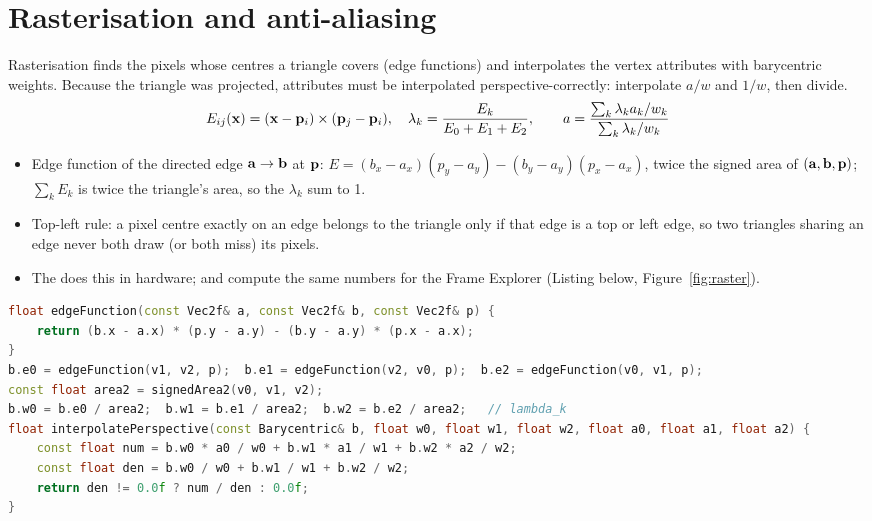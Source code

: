 \section{Rasterisation and anti-aliasing}
\label{sec:raster}
Rasterisation finds the pixels whose centres a triangle covers (edge functions) and interpolates the
vertex attributes with barycentric weights. Because the triangle was projected, attributes must be interpolated
perspective-correctly: interpolate $a/w$ and $1/w$, then divide.
\begin{equation}
E_{ij}(\mathbf{x})=(\mathbf{x}-\mathbf{p}_i)\times(\mathbf{p}_j-\mathbf{p}_i),\quad
\lambda_k=\frac{E_k}{E_0+E_1+E_2},\qquad
a=\frac{\sum_k\lambda_k a_k/w_k}{\sum_k\lambda_k/w_k}
\label{eq:raster}
\end{equation}
\begin{itemize}
\item Edge function of the directed edge $\mathbf{a}\to\mathbf{b}$ at $\mathbf{p}$: $E=(b_x-a_x)(p_y-a_y)-(b_y-a_y)(p_x-a_x)$, twice the
signed area of $(\mathbf{a},\mathbf{b},\mathbf{p})$; $\sum_kE_k$ is twice the triangle's area, so the $\lambda_k$ sum to 1.
\item Top-left rule: a pixel centre exactly on an edge belongs to the triangle only if that edge is a top or left edge,
so two triangles sharing an edge never both draw (or both miss) its pixels.
\item The  does this in hardware;  and  compute the
same numbers for the Frame Explorer (Listing below, Figure~\ref{fig:raster}).
\end{itemize}
\begin{lstlisting}[language=C++,caption={Edge functions, barycentric weights, perspective-correct interpolation (\code{math/ExplorerMath.cpp}).}]
float edgeFunction(const Vec2f& a, const Vec2f& b, const Vec2f& p) {
    return (b.x - a.x) * (p.y - a.y) - (b.y - a.y) * (p.x - a.x);
}
b.e0 = edgeFunction(v1, v2, p);  b.e1 = edgeFunction(v2, v0, p);  b.e2 = edgeFunction(v0, v1, p);
const float area2 = signedArea2(v0, v1, v2);
b.w0 = b.e0 / area2;  b.w1 = b.e1 / area2;  b.w2 = b.e2 / area2;   // lambda_k
float interpolatePerspective(const Barycentric& b, float w0, float w1, float w2, float a0, float a1, float a2) {
    const float num = b.w0 * a0 / w0 + b.w1 * a1 / w1 + b.w2 * a2 / w2;
    const float den = b.w0 / w0 + b.w1 / w1 + b.w2 / w2;
    return den != 0.0f ? num / den : 0.0f;
}
\end{lstlisting}

